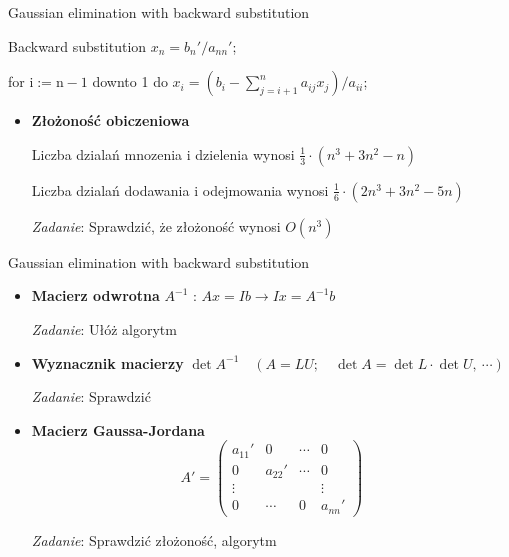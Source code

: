 \begin{frame}{Gaussian elimination with backward substitution}
\begin{exampleblock}{Backward substitution}
$x_{n}=b_{n}'/a_{nn}'$;

for $\mathrm{i}:=\mathrm{n}-1$ downto 1 do $x_{i}=(b_{i}-\displaystyle \sum_{j=i+1}^{n}a_{ij}x_{j})/a_{ii}$;
\end{exampleblock}

\begin{itemize}
\item \textbf{Złożoność obiczeniowa}

Liczba dziala\'{n} mnozenia $\mathrm{i}$ dzielenia wynosi $\displaystyle \frac{1}{3}\cdot(n^{3}+3n^{2}-n)$

Liczba dziala\'{n} dodawania $\mathrm{i}$ odejmowania wynosi $\displaystyle \frac{1}{6}\cdot(2n^{3}+3n^{2}-5n)$

\begin{flushright}
{\it Zadanie}: Sprawdzić, że złożoność wynosi $O(n^{3})$
\end{flushright} 

\end{itemize}

\end{frame}
\begin{frame}{Gaussian elimination with backward substitution}
\begin{itemize}
\item \textbf{Macierz odwrotna} \newline
$A^{-1}$ : $Ax=Ib\rightarrow Ix=A^{-1}b$
\begin{flushright}
{\it Zadanie}: Ułóż algorytm
\end{flushright}
\item \textbf{Wyznacznik macierzy}
$\det A^{-1}\quad(A=LU;\quad \det A=\det L\cdot\det U,\ \cdots)$
\begin{flushright}
{\it Zadanie}: Sprawdzić
\end{flushright}
\item \textbf{Macierz Gaussa-Jordana}
$$
A'=\left(\begin{array}{llll}
a_{11}' & 0 & \cdots & 0\\
0 & a_{22}' & \cdots & 0\\
\vdots &  &  & \vdots\\
 0 & \cdots & 0 & a_{nn}'
\end{array}\right)
$$
\begin{flushright}
{\it Zadanie}: Sprawdzić złożoność, algorytm
\end{flushright}
\end{itemize}
\end{frame}
